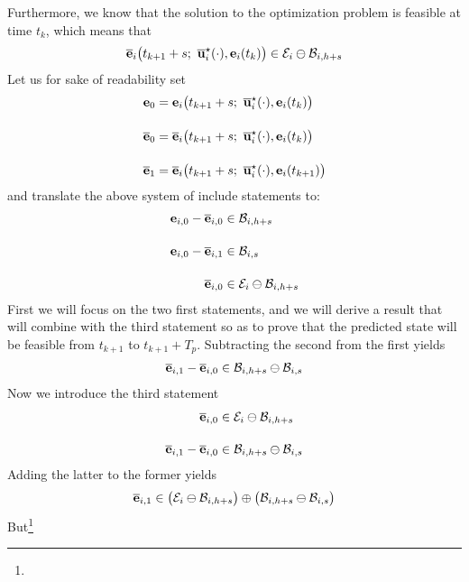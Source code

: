 \begin{gg_box}
Furthermore, we know that the solution to the optimization problem is
feasible at time $t_k$, which means that
\begin{align}
  \overline{\vect{e}}_i\big(t_{k+1} + s;\ \overline{\vect{u}}_i^{\star}(\cdot), \vect{e}_i(t_k)\big) \in \mathcal{E}_i \ominus \mathcal{B}_{i,h+s}
\end{align}
Let us for sake of readability set
\begin{align}
  \vect{e}_{0} &= \vect{e}_i\big(t_{k+1} + s;\ \overline{\vect{u}}_i^{\star}(\cdot), \vect{e}_i(t_k)\big) \\[2.5ex]
  \overline{\vect{e}}_{0} &= \overline{\vect{e}}_i\big(t_{k+1} + s;\ \overline{\vect{u}}_i^{\star}(\cdot), \vect{e}_i(t_k)\big) \\[2.5ex]
  \overline{\vect{e}}_{1} &= \overline{\vect{e}}_i\big(t_{k+1} + s;\ \overline{\vect{u}}_i^{\star}(\cdot), \vect{e}_i(t_{k+1})\big)
\end{align}
and translate the above system of include statements to:
\begin{align}
  \bm{\mathbf{e}}_{i,0} - \overline{\bm{\mathbf{e}}}_{i,0} &\in \mathcal{B}_{i, h+s} \\[2.5ex]
  \bm{\mathbf{e}}_{i,0} - \overline{\bm{\mathbf{e}}}_{i,1} &\in \mathcal{B}_{i,s} \\[2.5ex]
  \overline{\bm{\mathbf{e}}}_{i,0} &\in \mathcal{E}_i \ominus \mathcal{B}_{i,h+s}
\end{align}
First we will focus on the two first statements, and we will derive a result
that will combine with the third statement so as to prove that the predicted
state will be feasible from $t_{k+1}$ to $t_{k+1} + T_p$. Subtracting the
second from the first yields
\begin{align}
  \overline{\bm{\mathbf{e}}}_{i,1} - \overline{\bm{\mathbf{e}}}_{i,0} \in \mathcal{B}_{i, h+s} \ominus \mathcal{B}_{i,s}
\end{align}
Now we introduce the third statement
\begin{align}
  \overline{\bm{\mathbf{e}}}_{i,0} &\in \mathcal{E}_i \ominus \mathcal{B}_{i,h+s} \\[2.5ex]
  \overline{\bm{\mathbf{e}}}_{i,1}- \overline{\bm{\mathbf{e}}}_{i,0} &\in \mathcal{B}_{i, h+s} \ominus \mathcal{B}_{i,s}
\end{align}
Adding the latter to the former yields
\begin{align}
  \overline{\bm{\mathbf{e}}}_{i,1} \in \big(\mathcal{E}_i \ominus \mathcal{B}_{i,h+s}\big) \oplus \big(\mathcal{B}_{i, h+s} \ominus \mathcal{B}_{i,s}\big)
\end{align}
But\footnote{
}
\end{gg_box}
